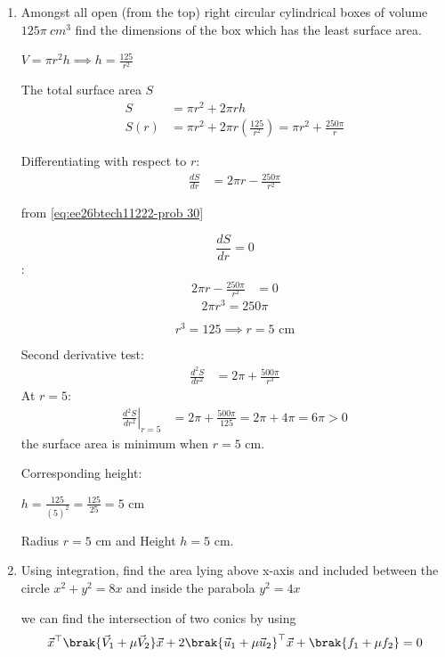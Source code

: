 \begin{enumerate}[label=\thesubsection.\arabic*, ref=\thesubsection.\theenumi]
\item 

Amongst all open (from the top) right circular cylindrical boxes of volume $125\pi~cm^{3}$ find the dimensions of the box which has the least surface area.  

\solution

$V=\pi r^2h \implies h= \frac{125}{r^2}$

The total surface area $S$
\begin{align}
S &= \pi r^2 + 2\pi r h \\
S(r) &= \pi r^2 + 2\pi r \left(\frac{125}{r^2}\right) = \pi r^2 + \frac{250\pi}{r}
\end{align}

Differentiating with respect to $r$:
\begin{align}
\frac{dS}{dr} &= 2\pi r - \frac{250\pi}{r^2}
\end{align}

from \eqref{eq:ee26btech11222-prob 30}

$$\frac{dS}{dr} = 0$$:
\begin{align}
2\pi r - \frac{250\pi}{r^2} &= 0 
\end{align}
$$2\pi r^3 = 250\pi$$ 

$$r^3 = 125 \implies r = 5\text{ cm}$$

Second derivative test:
\begin{align}
\frac{d^2S}{dr^2} &= 2\pi + \frac{500\pi}{r^3}
\end{align}
At $r = 5$:
\begin{align}
\left.\frac{d^2S}{dr^2}\right|_{r=5} &= 2\pi + \frac{500\pi}{125} = 2\pi + 4\pi = 6\pi > 0
\end{align}
the surface area is minimum when $r = 5\text{ cm}$.

Corresponding height:

$h = \frac{125}{(5)^2} = \frac{125}{25} = 5\text{ cm}$


Radius $r = 5\text{ cm}$ and Height $h = 5\text{ cm}$.

\item

Using integration, find the area lying above x-axis and included between the circle $x^{2}+y^{2}=8x$ and inside the parabola $y^{2}=4x$

\solution 

we can find the intersection of two conics by using 
\begin{align}
	\vec{x}^{\top}\brak{\vec{V}_1 + \mu\vec{V}_2}\vec{x}+2 \brak{\vec{u}_1+\mu \vec{u}_2}^{\top} \vec{x} 
	+ \brak{f_1+\mu f_2}= 0
	\label{eq:pair-mat-sing-conic}
\end{align}


\end{enumerate}
